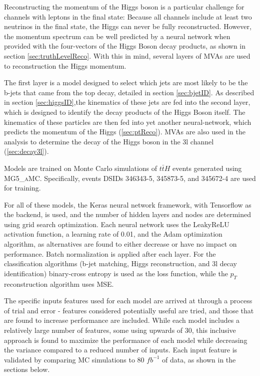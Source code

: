 Reconstructing the momentum of the Higgs boson is a particular challenge for channels with leptons in the final state: Because all channels include at least two neutrinos in the final state, the Higgs can never be fully reconstructed. However, the momentum spectrum can be well predicted by a neural network when provided with the four-vectors of the Higgs Boson decay products, as shown in section \ref{sec:truthLevelReco}. With this in mind, several layers of MVAs are used to reconstruction the Higgs momentum. 

The first layer is a model designed to select which jets are most likely to be the b-jets that came from the top decay, detailed in section \ref{sec:bjetID}. As described in section \ref{sec:higgsID},the kinematics of these jets are fed into the second layer, which is designed to identify the decay products of the Higgs Boson itself. The kinematics of these particles are then fed into yet another neural-network, which predicts the momentum of the Higgs (\ref{sec:ptReco}). MVAs are also used in the analysis to determine the decay of the Higgs boson in the 3l channel (\ref{sec:decay3l}). 

Models are trained on Monte Carlo simulations of $t\bar{t}H$ events generated using \textsc{MG5\_aMC}. Specifically, events DSIDs 346343-5, 345873-5, and 345672-4 are used for training.

For all of these models, the Keras neural network framework, with Tensorflow as the backend, is used, and the number of hidden layers and nodes are determined using grid search optimization. Each neural network uses the LeakyReLU activation function, a learning rate of 0.01, and the Adam optimization algorithm, as alternatives are found to either decrease or have no impact on performance. Batch normalization is applied after each layer. For the classification algorithms (b-jet matching, Higgs reconstruction, and 3l decay identification) binary-cross entropy is used as the loss function, while the $p_T$ reconstruction algorithm uses MSE. 

The specific inputs features used for each model are arrived at through a process of trial and error - features considered potentially useful are tried, and those that are found to increase performance are included. While each model includes a relatively large number of features, some using upwards of 30, this inclusive approach is found to maximize the performance of each model while decreasing the variance compared to a reduced number of inputs. Each input feature is validated by comparing MC simulations to 80 $fb^{-1}$ of data, as shown in the sections below.

